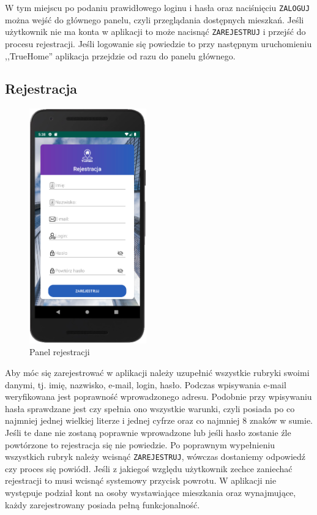 \documentclass[polish, 11pt]{article}
\begin{document}
         W tym miejscu po podaniu prawidłowego loginu i hasła oraz naciśnięciu \texttt{ZALOGUJ} można wejść do głównego panelu, czyli przeglądania dostępnych mieszkań. Jeśli użytkownik nie ma konta w aplikacji to może nacisnąć \texttt{ZAREJESTRUJ} i przejść do procesu rejestracji. Jeśli logowanie się powiedzie to przy następnym uruchomieniu ,,TrueHome'' aplikacja przejdzie od razu do panelu głównego.
    \subsection{Rejestracja}
        \begin{figure}[H]
                    \centering
                    \includegraphics[width=0.45\textwidth]{aplikacja/rejestracja.png}
                    \caption{Panel rejestracji}
        \end{figure}
        
        Aby móc się zarejestrować w aplikacji należy uzupełnić wszystkie rubryki swoimi danymi, tj. imię, nazwisko, e-mail, login, hasło. Podczas wpisywania  e-mail weryfikowana jest poprawność wprowadzonego adresu. Podobnie przy wpisywaniu hasła sprawdzane jest czy spełnia ono wszystkie warunki, czyli posiada po co najmniej jednej wielkiej literze i jednej cyfrze oraz co najmniej 8 znaków w sumie. Jeśli te dane nie zostaną poprawnie wprowadzone lub jeśli hasło zostanie źle powtórzone to rejestracja się nie powiedzie. Po poprawnym wypełnieniu wszystkich rubryk należy wcisnąć \texttt{ZAREJESTRUJ}, wówczas dostaniemy odpowiedź czy proces się powiódł. Jeśli z jakiegoś względu użytkownik zechce zaniechać rejestracji to musi wcisnąć systemowy przycisk powrotu. W aplikacji nie występuje podział kont na osoby wystawiające mieszkania oraz wynajmujące, każdy zarejestrowany posiada pełną funkcjonalność.
\end{document}
